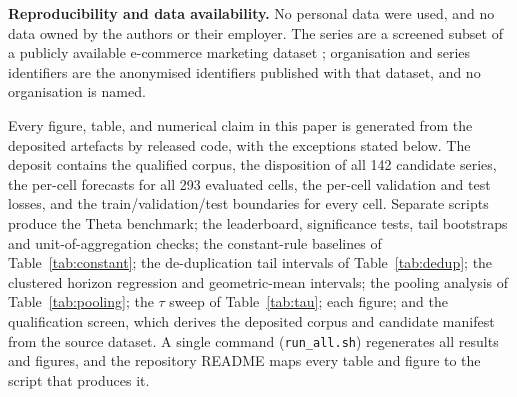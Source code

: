 \documentclass[11pt]{article}
\begin{document}
\textbf{Reproducibility and data availability.} No personal data were used, and no data owned by the authors or their employer. The series are a screened subset of a publicly available e-commerce marketing dataset \citep{anderson2024}; organisation and series identifiers are the anonymised identifiers published with that dataset, and no organisation is named.

\begin{sloppypar}
Every figure, table, and numerical claim in this paper is generated from the deposited artefacts by released code, with the exceptions stated below. The deposit contains the qualified corpus, the disposition of all 142 candidate series, the per-cell forecasts for all 293 evaluated cells, the per-cell validation and test losses, and the train/validation/test boundaries for every cell. Separate scripts produce the Theta benchmark; the leaderboard, significance tests, tail bootstraps and unit-of-aggregation checks; the constant-rule baselines of Table~\ref{tab:constant}; the de-duplication tail intervals of Table~\ref{tab:dedup}; the clustered horizon regression and geometric-mean intervals; the pooling analysis of Table~\ref{tab:pooling}; the $\tau$ sweep of Table~\ref{tab:tau}; each figure; and the qualification screen, which derives the deposited corpus and candidate manifest from the source dataset. A single command (\texttt{run\_all.sh}) regenerates all results and figures, and the repository README maps every table and figure to the script that produces it.
\end{sloppypar}
\end{document}
